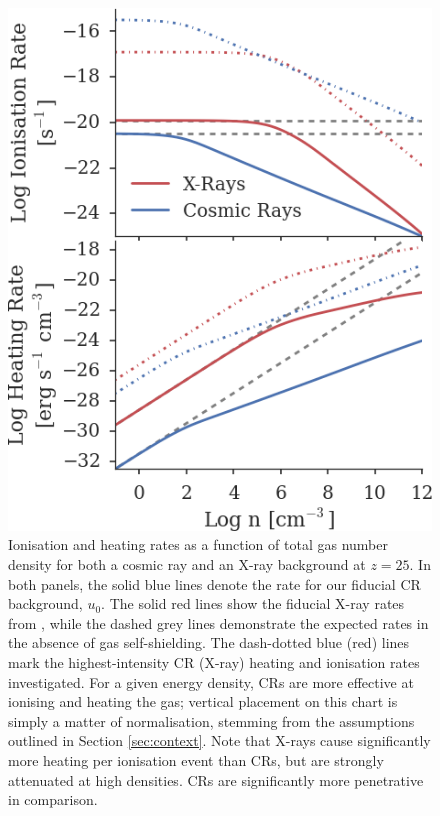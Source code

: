 \documentclass[usenatbib]{mn2e}
\begin{document}
\begin{figure}
\begin{center}
\includegraphics[width=\columnwidth]{figures/khrates/khrates}
\caption{\label{fig:khrates}
Ionisation and heating rates as a function of total gas number density for both a cosmic ray and an X-ray background at $z=25$. 
In both panels, the solid blue lines denote the rate for our fiducial CR background, $u_0$. The solid red lines show the fiducial X-ray rates from \citet{Hummeletal2015}, while the dashed grey lines demonstrate the expected rates in the absence of gas self-shielding.  
The dash-dotted blue (red) lines mark the highest-intensity CR (X-ray) heating and ionisation rates investigated. 
For a given energy density, CRs are more effective at ionising and heating the gas; vertical placement on this chart is simply a matter of normalisation, stemming from the assumptions outlined in Section \ref{sec:context}. 
Note that X-rays cause significantly more heating per ionisation event than CRs, but are strongly attenuated at high densities. CRs are significantly more penetrative in comparison.%
} 
\end{center}
\end{figure}
\end{document}
